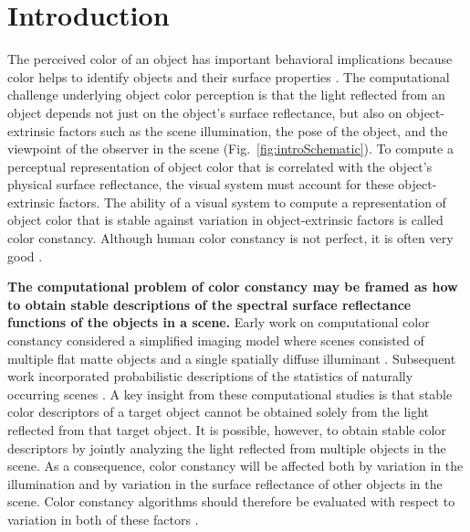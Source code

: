 \documentclass{jov}
\providecommand{\DIFaddtex}[1]{{\bf #1}} %
\providecommand{\DIFdeltex}[1]{} %
\providecommand{\DIFaddbegin}{} %
\providecommand{\DIFaddend}{} %
\providecommand{\DIFdelbegin}{} %
\providecommand{\DIFdelend}{} %
\providecommand{\DIFadd}[1]{\texorpdfstring{\DIFaddtex{#1}}{#1}} %
\providecommand{\DIFdel}[1]{\texorpdfstring{\DIFdeltex{#1}}{}} %
\newcommand{\DIFscaledelfig}{0.5}
\newlength{\DIFdelgraphicswidth} %
\newlength{\DIFdelgraphicsheight} %
\newcommand{\DIFaddincludegraphics}[2][]{{\color{blue}\fbox{\DIFOincludegraphics[#1]{#2}}}} %
\newcommand{\DIFdelincludegraphics}[2][]{%
\sbox{\DIFdelgraphicsbox}{\DIFOincludegraphics[#1]{#2}}%
\settoboxwidth{\DIFdelgraphicswidth}{\DIFdelgraphicsbox} %
\settoboxtotalheight{\DIFdelgraphicsheight}{\DIFdelgraphicsbox} %
\scalebox{\DIFscaledelfig}{%
\parbox[b]{\DIFdelgraphicswidth}{\usebox{\DIFdelgraphicsbox}\\[-\baselineskip] \rule{\DIFdelgraphicswidth}{0em}}\llap{\resizebox{\DIFdelgraphicswidth}{\DIFdelgraphicsheight}{%
\setlength{\unitlength}{\DIFdelgraphicswidth}%
\begin{picture}(1,1)%
\thicklines\linethickness{2pt} %
{\color[rgb]{1,0,0}\put(0,0){\framebox(1,1){}}}%
{\color[rgb]{1,0,0}\put(0,0){\line( 1,1){1}}}%
{\color[rgb]{1,0,0}\put(0,1){\line(1,-1){1}}}%
\end{picture}%
}\hspace*{3pt}}} %
} %
\DeclareRobustCommand{\DIFaddbegin}{\DIFOaddbegin \let\includegraphics\DIFaddincludegraphics} %
\DeclareRobustCommand{\DIFaddend}{\DIFOaddend \let\includegraphics\DIFOincludegraphics} %
\DeclareRobustCommand{\DIFdelbegin}{\DIFOdelbegin \let\includegraphics\DIFdelincludegraphics} %
\DeclareRobustCommand{\DIFdelend}{\DIFOaddend \let\includegraphics\DIFOincludegraphics} %
\begin{document}
\maketitle

\section{Introduction}
The perceived color of an object has important behavioral implications because color helps to identify objects and their surface properties \cite{Mollon89, Jacobs81}.
The computational challenge underlying object color perception is that the light reflected from an object depends not just on the object's surface reflectance, but also 
on object-extrinsic factors such as the scene illumination, the pose of the object, and the viewpoint of the observer in the scene (Fig.~\ref{fig:introSchematic}).
To compute a perceptual representation of object color that is correlated with the object's physical surface reflectance, the visual system must account for these object-extrinsic factors.
The ability of a visual system to compute a representation of object color that is stable against variation in object-extrinsic factors is called color constancy.
Although human color constancy is not perfect, it is often very good \cite{FosterColorConstancy, BrainardColorConstancy}. 

\DIFaddbegin \DIFadd{The computational problem of color constancy may be framed as how to obtain stable descriptions of the spectral surface reflectance functions of the objects in a scene.
}\DIFaddend Early work on computational color constancy considered a simplified imaging model where scenes consisted of multiple flat matte objects and a single spatially diffuse illuminant \cite{LandRetinex,Buchsbaum80,MaloneyWandell86}.
Subsequent work incorporated probabilistic descriptions of the statistics of naturally occurring scenes \cite{D'ZmuraConstancy3, D'ZmuraIversonSinger,BrainardFreeman}.
A key insight from these computational studies is that stable color descriptors of a target object cannot be obtained solely from the light reflected from that target object.
It is possible, however, to obtain stable color descriptors by jointly analyzing the light reflected from multiple objects in the scene.
As a consequence, color constancy will be affected both by variation in the illumination and by variation in the surface reflectance of other objects in the scene.  Color constancy algorithms should therefore be evaluated with respect to variation in both of these factors \DIFdelbegin \DIFdel{\cite{BrainardWandellRetinex,BrainardFreeman}}\DIFdelend \DIFaddbegin \DIFadd{\cite{brainard1986analysis,BrainardFreeman}}\DIFaddend . 
\end{document}

